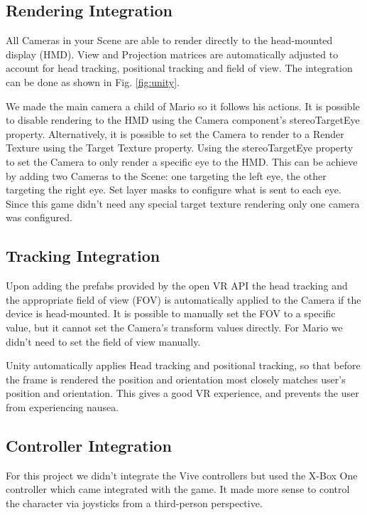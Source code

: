 \documentclass[journal]{IEEEtran}
\begin{document}
\subsection{Rendering Integration}

All Cameras in your Scene are able to render directly to the head-mounted display (HMD). View and Projection matrices are automatically adjusted to account for head tracking, positional tracking and field of view. The integration can be done as shown in Fig. \ref{fig:unity}.

We made the main camera a child of Mario so it follows his actions. It is possible to disable rendering to the HMD using the Camera component’s stereoTargetEye property. Alternatively, it is possible to set the Camera to render to a Render Texture using the Target Texture property.
Using the stereoTargetEye property to set the Camera to only render a specific eye to the HMD. This can be achieve by adding two Cameras to the Scene: one targeting the left eye, the other targeting the right eye. Set layer masks to configure what is sent to each eye. Since this game didn't need any special target texture rendering only one camera was configured.



\subsection{Tracking Integration}

Upon adding the prefabs provided by the open VR API the head tracking and the appropriate field of view (FOV) is automatically applied to the Camera if the device is head-mounted. It is possible to manually set the FOV to a specific value, but it cannot set the Camera’s transform values directly. For Mario we didn't need to set the field of view manually.

Unity automatically applies Head tracking and positional tracking, so that before the frame is rendered the position and orientation most closely matches user’s position and orientation. This gives a good VR experience, and prevents the user from experiencing nausea.

\subsection{Controller Integration}

For this project we didn't integrate the Vive controllers but used the X-Box One controller which came integrated with the game. It made more sense to control the character via joysticks from a third-person perspective.
\end{document}
